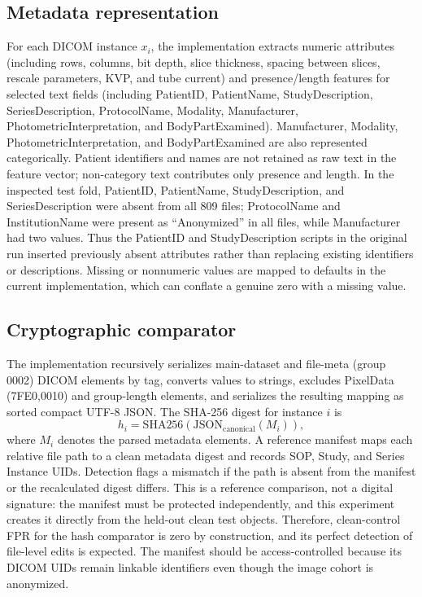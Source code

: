 \documentclass[journal]{IEEEtran}
\begin{document}
  \subsection{Metadata representation}
  For each DICOM instance $x_i$, the implementation extracts numeric attributes (including rows, columns, bit depth, slice thickness, spacing between slices, rescale parameters, KVP, and tube current) and presence/length features for selected text fields (including PatientID, PatientName, StudyDescription, SeriesDescription, ProtocolName, Modality, Manufacturer, PhotometricInterpretation, and BodyPartExamined). Manufacturer, Modality, PhotometricInterpretation, and BodyPartExamined are also represented categorically. Patient identifiers and names are not retained as raw text in the feature vector; non-category text contributes only presence and length. In the inspected test fold, PatientID, PatientName, StudyDescription, and SeriesDescription were absent from all 809 files; ProtocolName and InstitutionName were present as ``Anonymized'' in all files, while Manufacturer had two values. Thus the PatientID and StudyDescription scripts in the original run inserted previously absent attributes rather than replacing existing identifiers or descriptions. Missing or nonnumeric values are mapped to defaults in the current implementation, which can conflate a genuine zero with a missing value.
  
  \subsection{Cryptographic comparator}
  The implementation recursively serializes main-dataset and file-meta (group 0002) DICOM elements by tag, converts values to strings, excludes PixelData (7FE0,0010) and group-length elements, and serializes the resulting mapping as sorted compact UTF-8 JSON. The SHA-256 digest for instance $i$ is
  \begin{equation}
  h_i = \mathrm{SHA256}(\mathrm{JSON}_{\mathrm{canonical}}(M_i)),
  \end{equation}
  where $M_i$ denotes the parsed metadata elements. A reference manifest maps each relative file path to a clean metadata digest and records SOP, Study, and Series Instance UIDs. Detection flags a mismatch if the path is absent from the manifest or the recalculated digest differs. This is a reference comparison, not a digital signature: the manifest must be protected independently, and this experiment creates it directly from the held-out clean test objects. Therefore, clean-control FPR for the hash comparator is zero by construction, and its perfect detection of file-level edits is expected. The manifest should be access-controlled because its DICOM UIDs remain linkable identifiers even though the image cohort is anonymized.
\end{document}
